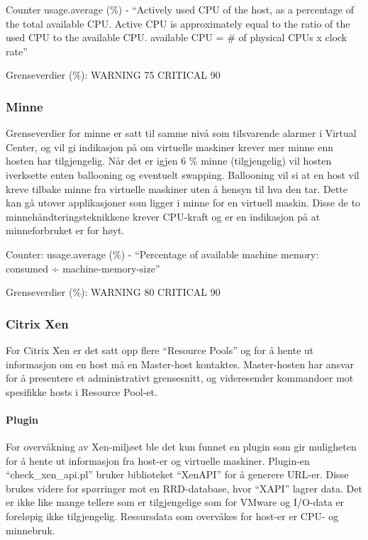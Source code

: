Counter usage.average (\%) - ``Actively used CPU of the host, as a percentage of the total available CPU. Active CPU is approximately equal to the ratio of the used CPU to the available CPU. available CPU = \# of physical CPUs x clock rate''

Grenseverdier (\%): WARNING 75 CRITICAL 90

\subsubsection*{Minne}
Grenseverdier for minne er satt til samme nivå som tilsvarende alarmer i Virtual Center, og vil gi indikasjon på om virtuelle maskiner krever mer minne enn hosten har tilgjengelig. Når det er igjen 6 \% minne (tilgjengelig) vil hosten iverksette enten ballooning og eventuelt swapping. Ballooning vil si at en host vil kreve tilbake minne fra virtuelle maskiner uten å hensyn til hva den tar. Dette kan gå utover applikasjoner som ligger i minne for en virtuell maskin. Disse de to minnehåndteringsteknikkene krever CPU-kraft og er en indikasjon på at minneforbruket er for høyt.

Counter: usage.average (\%) - ``Percentage of available machine memory: consumed ÷ machine-memory-size''

Grenseverdier (\%): WARNING 80 CRITICAL 90

\subsubsection{Citrix Xen}
For Citrix Xen er det satt opp flere ``Resource Pools'' og for å hente ut informasjon om en host må en Master-host kontaktes. Master-hosten har ansvar for å presentere et administrativt grensesnitt, og videresender kommandoer mot spesifikke hosts i Resource Pool-et.

\paragraph{Plugin}
For overvåkning av Xen-miljøet ble det kun funnet en plugin som gir muligheten for å hente ut informasjon fra host-er og virtuelle maskiner. Plugin-en ``check\_xen\_api.pl'' bruker biblioteket ``XenAPI'' for å generere URL-er. Disse brukes videre for spørringer mot en RRD-database, hvor ``XAPI'' lagrer data\cite{xenwiki}. Det er ikke like mange tellere som er tilgjengelige som for VMware og I/O-data er foreløpig ikke tilgjengelig. Ressursdata som overvåkes for host-er er CPU- og minnebruk.

